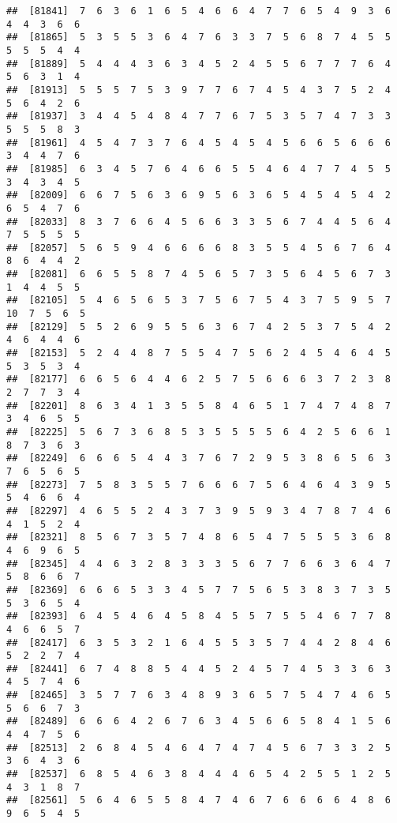 \documentclass[
]{book}
\begin{document}
\begin{verbatim}
##  [81841]  7  6  3  6  1  6  5  4  6  6  4  7  7  6  5  4  9  3  6  4  4  3  6  6
##  [81865]  5  3  5  5  3  6  4  7  6  3  3  7  5  6  8  7  4  5  5  5  5  5  4  4
##  [81889]  5  4  4  4  3  6  3  4  5  2  4  5  5  6  7  7  7  6  4  5  6  3  1  4
##  [81913]  5  5  5  7  5  3  9  7  7  6  7  4  5  4  3  7  5  2  4  5  6  4  2  6
##  [81937]  3  4  4  5  4  8  4  7  7  6  7  5  3  5  7  4  7  3  3  5  5  5  8  3
##  [81961]  4  5  4  7  3  7  6  4  5  4  5  4  5  6  6  5  6  6  6  3  4  4  7  6
##  [81985]  6  3  4  5  7  6  4  6  6  5  5  4  6  4  7  7  4  5  5  3  4  3  4  5
##  [82009]  6  6  7  5  6  3  6  9  5  6  3  6  5  4  5  4  5  4  2  6  5  4  7  6
##  [82033]  8  3  7  6  6  4  5  6  6  3  3  5  6  7  4  4  5  6  4  7  5  5  5  5
##  [82057]  5  6  5  9  4  6  6  6  6  8  3  5  5  4  5  6  7  6  4  8  6  4  4  2
##  [82081]  6  6  5  5  8  7  4  5  6  5  7  3  5  6  4  5  6  7  3  1  4  4  5  5
##  [82105]  5  4  6  5  6  5  3  7  5  6  7  5  4  3  7  5  9  5  7 10  7  5  6  5
##  [82129]  5  5  2  6  9  5  5  6  3  6  7  4  2  5  3  7  5  4  2  4  6  4  4  6
##  [82153]  5  2  4  4  8  7  5  5  4  7  5  6  2  4  5  4  6  4  5  5  3  5  3  4
##  [82177]  6  6  5  6  4  4  6  2  5  7  5  6  6  6  3  7  2  3  8  2  7  7  3  4
##  [82201]  8  6  3  4  1  3  5  5  8  4  6  5  1  7  4  7  4  8  7  3  4  6  5  5
##  [82225]  5  6  7  3  6  8  5  3  5  5  5  5  6  4  2  5  6  6  1  8  7  3  6  3
##  [82249]  6  6  6  5  4  4  3  7  6  7  2  9  5  3  8  6  5  6  3  7  6  5  6  5
##  [82273]  7  5  8  3  5  5  7  6  6  6  7  5  6  4  6  4  3  9  5  5  4  6  6  4
##  [82297]  4  6  5  5  2  4  3  7  3  9  5  9  3  4  7  8  7  4  6  4  1  5  2  4
##  [82321]  8  5  6  7  3  5  7  4  8  6  5  4  7  5  5  5  3  6  8  4  6  9  6  5
##  [82345]  4  4  6  3  2  8  3  3  3  5  6  7  7  6  6  3  6  4  7  5  8  6  6  7
##  [82369]  6  6  6  5  3  3  4  5  7  7  5  6  5  3  8  3  7  3  5  5  3  6  5  4
##  [82393]  6  4  5  4  6  4  5  8  4  5  5  7  5  5  4  6  7  7  8  4  6  6  5  7
##  [82417]  6  3  5  3  2  1  6  4  5  5  3  5  7  4  4  2  8  4  6  5  2  2  7  4
##  [82441]  6  7  4  8  8  5  4  4  5  2  4  5  7  4  5  3  3  6  3  4  5  7  4  6
##  [82465]  3  5  7  7  6  3  4  8  9  3  6  5  7  5  4  7  4  6  5  5  6  6  7  3
##  [82489]  6  6  6  4  2  6  7  6  3  4  5  6  6  5  8  4  1  5  6  4  4  7  5  6
##  [82513]  2  6  8  4  5  4  6  4  7  4  7  4  5  6  7  3  3  2  5  3  6  4  3  6
##  [82537]  6  8  5  4  6  3  8  4  4  4  6  5  4  2  5  5  1  2  5  4  3  1  8  7
##  [82561]  5  6  4  6  5  5  8  4  7  4  6  7  6  6  6  6  4  8  6  9  6  5  4  5

\end{verbatim}
\end{document}
